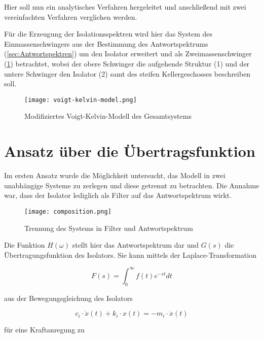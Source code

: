 Hier soll nun ein analytisches Verfahren hergeleitet und anschließend mit zwei vereinfachten Verfahren verglichen werden. 

Für die Erzeugung der Isolationsspektren wird hier das System des Einmassenschwingers aus der Bestimmung des Antwortspektrums (\cref{sec:Antwortspektren}) um den Isolator erweitert und als Zweimassenschwinger (\cref{fig:vkm}) betrachtet, wobei der obere Schwinger die aufgehende Struktur (1) und der untere Schwinger den Isolator (2) samt des steifen Kellergeschosses beschreiben soll.

\begin{figure}[ht]
    \centering
    \texttt{[image: voigt-kelvin-model.png]}
    \caption{Modifiziertes Voigt-Kelvin-Modell des Gesamtsystems}
    \label{fig:vkm}
\end{figure}

\pagebreak

\section{Ansatz über die Übertragsfunktion}
\label{sec:ansatzfunktion}

Im ersten Ansatz wurde die Möglichkeit untersucht, das Modell in zwei unabhängige Systeme zu zerlegen und diese getrennt zu betrachten.
Die Annahme war, dass der Isolator lediglich als Filter auf das Antwortspektrum wirkt.

\begin{figure}[H]
    \centering
    \texttt{[image: composition.png]}
    \caption{Trennung des Systems in Filter und Antwortspektrum}
    \label{fig:composition}
\end{figure}

Die Funktion $H(\omega)$ stellt hier das Antwortspektrum dar und $G(s)$ die Übertragungsfunktion des Isolators.
Sie kann mittels der Laplace-Transformation

\begin{equation} \label{laplace}
F(s) = \int_{0}^{\infty} f(t)e^{-st}dt
\end{equation}

aus der Bewegungsgleichung des Isolators \cite{Kramer}

\begin{equation}\label{eq:bewegungsgleichung}
c_i \cdot \dot x(t) + k_i \cdot x(t) = - m_i \cdot \ddot x(t)
\end{equation}

für eine Kraftanregung zu

